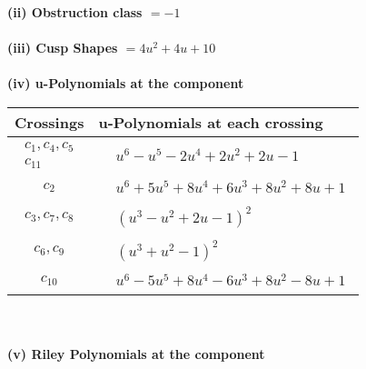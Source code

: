 \documentclass[1p]{elsarticle_modified}
\theoremstyle{definition}
\begin{document}
\flushleft \textbf{(ii) Obstruction class $= -1$}\\~\\
\flushleft \textbf{(iii) Cusp Shapes $= 4 u^2+4 u+10$}\\~\\
\newpage\renewcommand{\arraystretch}{1}
\flushleft \textbf{(iv) u-Polynomials at the component}\newline \\
\begin{tabular}{m{50pt}|m{274pt}}
Crossings & \hspace{64pt}u-Polynomials at each crossing \\
\hline $$\begin{aligned}c_{1},c_{4},c_{5}\\c_{11}\end{aligned}$$&$\begin{aligned}
&u^6- u^5-2 u^4+2 u^2+2 u-1
\end{aligned}$\\
\hline $$\begin{aligned}c_{2}\end{aligned}$$&$\begin{aligned}
&u^6+5 u^5+8 u^4+6 u^3+8 u^2+8 u+1
\end{aligned}$\\
\hline $$\begin{aligned}c_{3},c_{7},c_{8}\end{aligned}$$&$\begin{aligned}
&(u^3- u^2+2 u-1)^2
\end{aligned}$\\
\hline $$\begin{aligned}c_{6},c_{9}\end{aligned}$$&$\begin{aligned}
&(u^3+u^2-1)^2
\end{aligned}$\\
\hline $$\begin{aligned}c_{10}\end{aligned}$$&$\begin{aligned}
&u^6-5 u^5+8 u^4-6 u^3+8 u^2-8 u+1
\end{aligned}$\\
\hline
\end{tabular}\\~\\
\newpage\renewcommand{\arraystretch}{1}
\flushleft \textbf{(v) Riley Polynomials at the component}\newline \\
\end{document}
